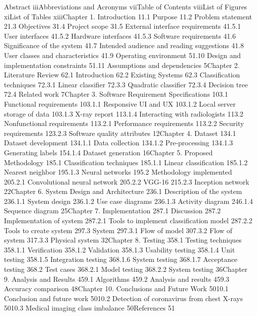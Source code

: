 \documentclass{article} %
\begin{document}
\noindent Abstract iiiAbbreviations and Acronyms viiTable of Contents viiiList of Figures xiList of Tables xiiiChapter 1. Introduction 11.1 Purpose 11.2 Problem statement 21.3 Objectives 31.4 Project scope 31.5 External interface requirements 41.5.1 User interfaces 41.5.2 Hardware interfaces 41.5.3 Software requirements 41.6 Significance of the system 41.7 Intended audience and reading suggestions 41.8 User classes and characteristics 41.9 Operating environment 51.10 Design and implementation constraints 51.11 Assumptions and dependencies 5Chapter 2. Literature Review 62.1 Introduction 62.2 Existing Systems 62.3 Classification techniques 72.3.1 Linear classifier 72.3.3 Quadratic classifier 72.3.4 Decision tree 72.4 Related work 7Chapter 3. Software Requirement Specifications 103.1 Functional requirements 103.1.1  Responsive UI and UX 103.1.2  Local server storage of data 103.1.3 X-ray report 113.1.4  Interacting with radiologists 113.2 Nonfunctional requirements 113.2.1 Performance requirements 113.2.2 Security requirements 123.2.3 Software quality attributes 12Chapter 4. Dataset 134.1 Dataset development 134.1.1 Data collection 134.1.2 Pre-processing 134.1.3 Generating labels 154.1.4 Dataset generation 16Chapter 5. Proposed Methodology 185.1 Classification techniques 185.1.1 Linear classification 185.1.2 Nearest neighbor 195.1.3 Neural networks 195.2 Methodology implemented 205.2.1 Convolutional neural network 205.2.2 VGG-16 215.2.3 Inception network 22Chapter 6. System Design and Architecture 236.1 Description of the system 236.1.1 System design 236.1.2 Use case diagrams 236.1.3 Activity diagram 246.1.4 Sequence diagram 25Chapter 7. Implementation 287.1 Discussion 287.2 Implementation of system 287.2.1 Tools to implement classification model 287.2.2 Tools to create system 297.3 System 297.3.1 Flow of model 307.3.2 Flow of system 317.3.3 Physical system 32Chapter 8. Testing 358.1 Testing techniques 358.1.1 Verification 358.1.2 Validation 358.1.3 Usability testing 358.1.4 Unit testing 358.1.5 Integration testing 368.1.6 System testing 368.1.7 Acceptance testing 368.2 Test cases 368.2.1 Model testing 368.2.2 System testing 36Chapter 9. Analysis and Results 459.1 Algorithms 459.2 Analysis and results 459.3 Accuracy comparison 48Chapter 10. Conclusions and Future Work 5010.1 Conclusion and future work 5010.2 Detection of coronavirus from chest X-rays 5010.3 Medical imaging class imbalance 50References 51

\noindent \eject \textbf{}

\noindent 
\end{document}
